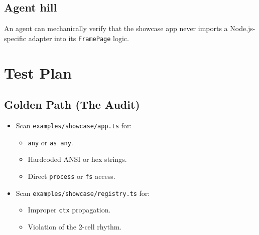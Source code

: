 \subsection{Agent hill}\label{record-252-agent-hill}

An agent can mechanically verify that the showcase app never imports a Node.js-specific adapter into its \texttt{F\allowbreak{}r\allowbreak{}a\allowbreak{}m\allowbreak{}e\allowbreak{}P\allowbreak{}a\allowbreak{}g\allowbreak{}e} logic.

\section{Test Plan}\label{record-252-test-plan}

\subsection{Golden Path (The Audit)}\label{record-252-golden-path-the-audit}

\begin{itemize}
\tightlist
\item
  Scan \texttt{e\allowbreak{}x\allowbreak{}a\allowbreak{}m\allowbreak{}p\allowbreak{}l\allowbreak{}e\allowbreak{}s\allowbreak{}/\allowbreak{}s\allowbreak{}h\allowbreak{}o\allowbreak{}w\allowbreak{}c\allowbreak{}a\allowbreak{}s\allowbreak{}e\allowbreak{}/\allowbreak{}a\allowbreak{}p\allowbreak{}p\allowbreak{}.\allowbreak{}t\allowbreak{}s} for:

  \begin{itemize}
  \tightlist
  \item
    \texttt{a\allowbreak{}n\allowbreak{}y} or \texttt{a\allowbreak{}s\allowbreak{} \allowbreak{}a\allowbreak{}n\allowbreak{}y}.
  \item
    Hardcoded ANSI or hex strings.
  \item
    Direct \texttt{p\allowbreak{}r\allowbreak{}o\allowbreak{}c\allowbreak{}e\allowbreak{}s\allowbreak{}s} or \texttt{f\allowbreak{}s} access.
  \end{itemize}
\item
  Scan \texttt{e\allowbreak{}x\allowbreak{}a\allowbreak{}m\allowbreak{}p\allowbreak{}l\allowbreak{}e\allowbreak{}s\allowbreak{}/\allowbreak{}s\allowbreak{}h\allowbreak{}o\allowbreak{}w\allowbreak{}c\allowbreak{}a\allowbreak{}s\allowbreak{}e\allowbreak{}/\allowbreak{}r\allowbreak{}e\allowbreak{}g\allowbreak{}i\allowbreak{}s\allowbreak{}t\allowbreak{}r\allowbreak{}y\allowbreak{}.\allowbreak{}t\allowbreak{}s} for:

  \begin{itemize}
  \tightlist
  \item
    Improper \texttt{c\allowbreak{}t\allowbreak{}x} propagation.
  \item
    Violation of the 2-cell rhythm.
  \end{itemize}
\end{itemize}

